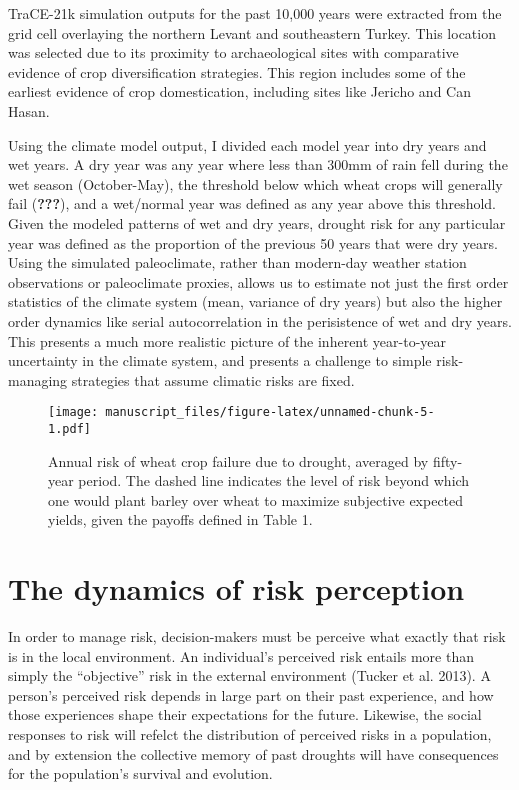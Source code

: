 \documentclass[smallextended]{svjour3}       %
\begin{document}
TraCE-21k simulation outputs for the past 10,000 years were extracted
from the grid cell overlaying the northern Levant and southeastern
Turkey. This location was selected due to its proximity to
archaeological sites with comparative evidence of crop diversification
strategies. This region includes some of the earliest evidence of crop
domestication, including sites like Jericho and Can Hasan.

Using the climate model output, I divided each model year into dry years
and wet years. A dry year was any year where less than 300mm of rain
fell during the wet season (October-May), the threshold below which
wheat crops will generally fail ({\textbf{???}}), and a wet/normal year
was defined as any year above this threshold. Given the modeled patterns
of wet and dry years, drought risk for any particular year was defined
as the proportion of the previous 50 years that were dry years. Using
the simulated paleoclimate, rather than modern-day weather station
observations or paleoclimate proxies, allows us to estimate not just the
first order statistics of the climate system (mean, variance of dry
years) but also the higher order dynamics like serial autocorrelation in
the perisistence of wet and dry years. This presents a much more
realistic picture of the inherent year-to-year uncertainty in the
climate system, and presents a challenge to simple risk-managing
strategies that assume climatic risks are fixed.

\begin{figure}
\centering
\texttt{[image: manuscript\_files/figure-latex/unnamed-chunk-5-1.pdf]}
\caption{Annual risk of wheat crop failure due to drought, averaged by
fifty-year period. The dashed line indicates the level of risk beyond
which one would plant barley over wheat to maximize subjective expected
yields, given the payoffs defined in Table 1.}
\end{figure}

\hypertarget{sec:3}{%
\section{The dynamics of risk perception}\label{sec:3}}

In order to manage risk, decision-makers must be perceive what exactly
that risk is in the local environment. An individual's perceived risk
entails more than simply the ``objective'' risk in the external
environment (Tucker et al. 2013). A person's perceived risk depends in
large part on their past experience, and how those experiences shape
their expectations for the future. Likewise, the social responses to
risk will refelct the distribution of perceived risks in a population,
and by extension the collective memory of past droughts will have
consequences for the population's survival and evolution.
\end{document}

